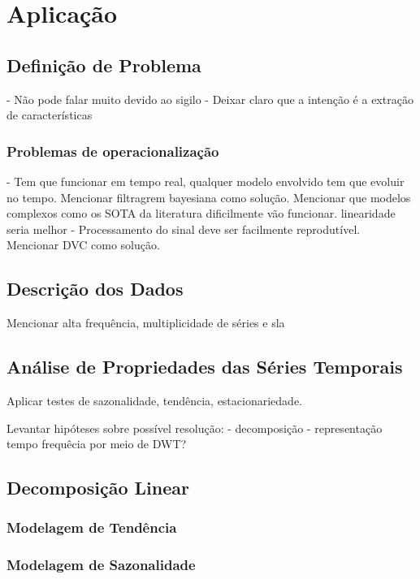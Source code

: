 \chapter{Aplicação}
\label{chap:aplicacoes}

\section{Definição de Problema}

- Não pode falar muito devido ao sigilo
- Deixar claro que a intenção é a extração de características

\subsection{Problemas de operacionalização}

- Tem que funcionar em tempo real, qualquer modelo envolvido tem que evoluir
no tempo. Mencionar filtragrem bayesiana como solução. Mencionar que modelos
complexos como os SOTA da literatura dificilmente vão funcionar. linearidade
seria melhor
- Processamento do sinal deve ser facilmente reprodutível. Mencionar DVC como
solução.

\section{Descrição dos Dados}

Mencionar alta frequência, multiplicidade de séries e sla

\section{Análise de Propriedades das Séries Temporais}

Aplicar testes de sazonalidade, tendência, estacionariedade.

Levantar hipóteses sobre possível resolução:
    - decomposição
    - representação tempo frequêcia por meio de DWT?

\section{Decomposição Linear}

\subsection{Modelagem de Tendência}

\subsection{Modelagem de Sazonalidade}

